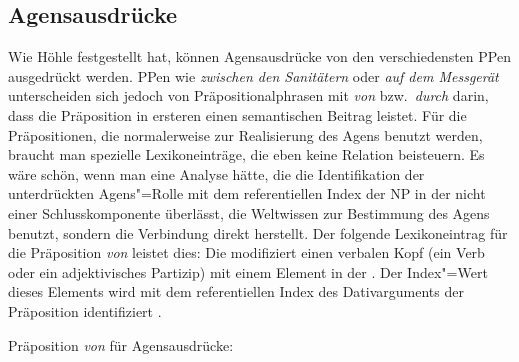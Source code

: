 {


\subsection{Agensausdrücke}
\label{sec-analyse-agensausdruecke}

Wie Höhle festgestellt hat, können Agensausdrücke von den verschiedensten PPen
ausgedrückt werden. PPen wie \emph{zwischen den Sanitätern} oder \emph{auf dem Messgerät}
unterscheiden sich jedoch von Präpositionalphrasen mit \emph{von} bzw.\ \emph{durch} darin,
dass die Präposition in ersteren einen semantischen Beitrag leistet. Für die Präpositionen,
die normalerweise zur Realisierung des Agens benutzt werden, braucht man spezielle
Lexikoneinträge, die eben keine Relation beisteuern. Es wäre schön, wenn man eine Analyse hätte,
die die Identifikation der unterdrückten Agens"=Rolle mit dem referentiellen Index der NP in
der \vonpp nicht einer Schlusskomponente überlässt, die Weltwissen zur Bestimmung des Agens benutzt,
sondern die Verbindung direkt herstellt.
Der folgende Lexikoneintrag für die Präposition \emph{von} leistet dies:
Die \vonpp modifiziert einen verbalen Kopf (ein Verb oder ein adjektivisches Partizip) mit
einem Element in der \daliste. Der Index"=Wert dieses Elements wird mit dem referentiellen
Index des Dativarguments der Präposition identifiziert .

\eas
Präposition \emph{von} für Agensausdrücke:\\
\zs

}

